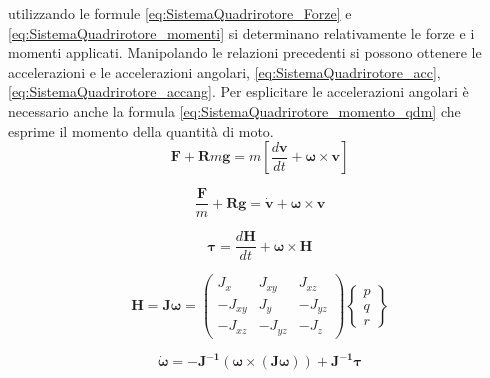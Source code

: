 utilizzando le formule \ref{eq:SistemaQuadrirotore_Forze} e \ref{eq:SistemaQuadrirotore_momenti} si determinano relativamente le forze e i momenti applicati. Manipolando le relazioni precedenti si possono ottenere le accelerazioni e le accelerazioni angolari, \ref{eq:SistemaQuadrirotore_acc}, \ref{eq:SistemaQuadrirotore_accang}. Per esplicitare le accelerazioni angolari è necessario anche la formula \ref{eq:SistemaQuadrirotore_momento_qdm} che esprime il momento della quantità di moto.
\begin{equation}\label{eq:SistemaQuadrirotore_Forze}
	\mathbf{F} + \mathbf{R} m \mathbf{g} = m \left[\frac{d \mathbf{v}}{d t} + \boldsymbol{\omega}\times \mathbf{v}\right]
\end{equation}

\begin{equation}\label{eq:SistemaQuadrirotore_acc}
	\frac{\mathbf{F}}{m} + \mathbf{R} \mathbf{g} = \mathbf{\dot{v}} + \boldsymbol{\omega} \times \mathbf{v}
\end{equation}

\begin{equation}\label{eq:SistemaQuadrirotore_momenti}
	\boldsymbol{\tau} = \frac{d \mathbf{H}}{d t } + \boldsymbol{\omega} \times \mathbf{H}
\end{equation}

\begin{equation}\label{eq:SistemaQuadrirotore_momento_qdm}
	\mathbf{H} = \mathbf{J} \boldsymbol{\omega} =
	\begin{pmatrix}
		J_x & J_{xy} & J_{xz} \\
		-J_{xy} & J_y & -J_{yz} \\
		-J_{xz} & -J_{yz} & -J_z 
	\end{pmatrix}
	\begin{Bmatrix}
		p\\
		q\\
		r
	\end{Bmatrix}
\end{equation}

\begin{equation}\label{eq:SistemaQuadrirotore_accang}
	\boldsymbol{\dot{\omega}} = - \mathbf{J^{-1}}\left(\boldsymbol{\omega}\times\left(\mathbf{J}\boldsymbol{\omega}\right)\right) + \mathbf{J^{-1}}\boldsymbol{\tau}
\end{equation}

